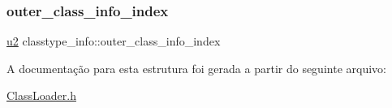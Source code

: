 \mbox{\label{structclasstype__info_addb19ba72e3ccfc7b7e5630b872e87f1}} 
\subsubsection{\texorpdfstring{outer\+\_\+class\+\_\+info\+\_\+index}{outer\_class\_info\_index}}
{\footnotesize\ttfamily \hyperlink{ClassLoader_8h_a5f223212eef04d10a4550ded680cb1cf}{u2} classtype\+\_\+info\+::outer\+\_\+class\+\_\+info\+\_\+index}



A documentação para esta estrutura foi gerada a partir do seguinte arquivo\+:\begin{DoxyCompactItemize}
\item 
\hyperlink{ClassLoader_8h}{Class\+Loader.\+h}\end{DoxyCompactItemize}
